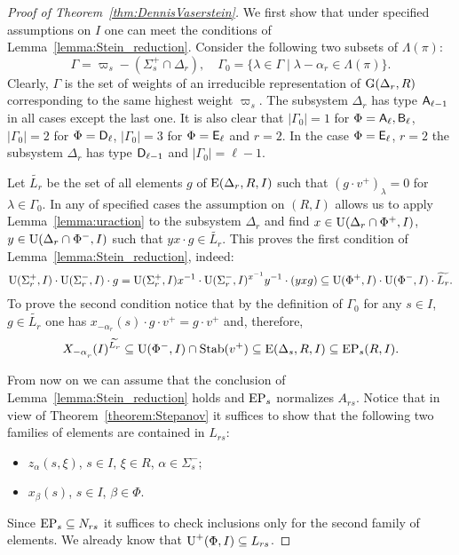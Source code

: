 \begin{proof}[Proof of Theorem~\ref{thm:DennisVaserstein}]
We first show that under specified assumptions on $I$ one can meet the conditions of Lemma~\ref{lemma:Stein_reduction}.
Consider the following two subsets of $\Lambda(\pi)$:
$$\Gamma = \varpi_s- (\Sigma_s^+\cap \Delta_r),\quad \Gamma_0 = \{\lambda \in \Gamma \mid \lambda - \alpha_r \in \Lambda(\pi) \}.$$
Clearly, $\Gamma$ is the set of weights of an irreducible representation of $\operatorname{G}(\Delta_r, R)$ corresponding to the same highest weight $\varpi_s$.
The subsystem $\Delta_r$ has type $\mathsf{A}_{\ell-1}$ in all cases except the last one.
It is also clear that $|\Gamma_0|=1$ for $\Phi=\mathsf{A}_\ell, \mathsf{B}_\ell$, $|\Gamma_0|=2$ for $\Phi=\mathsf{D}_\ell$, $|\Gamma_0|=3$ for $\Phi=\mathsf{E}_\ell$ and $r=2$.
In the case $\Phi=\mathsf{E}_\ell$, $r=2$ the subsystem $\Delta_r$ has type $\mathsf{D}_{\ell-1}$ and $|\Gamma_0|=\ell-1$.

Let $\widetilde{L_r}$ be the set of all elements $g$ of $\operatorname{E}(\Delta_r,R, I)$ such that $(g \cdot v^+)_\lambda = 0$ for $\lambda\in\Gamma_0$.
In any of specified cases the assumption on $(R, I)$ allows us to apply Lemma~\ref{lemma:uraction} to the subsystem $\Delta_r$ and find
$x\in\operatorname{U}(\Delta_r\cap\Phi^+, I)$, $y\in \operatorname{U}(\Delta_r\cap\Phi^-, I)$ such that $yx\cdot g \in \widetilde{L_r}$.
This proves the first condition of Lemma~\ref{lemma:Stein_reduction}, indeed:
$$ \operatorname{U}(\Sigma^+_r, I)\cdot \operatorname{U}(\Sigma^-_r, I) \cdot g = \operatorname{U}(\Sigma^+_r, I) x^{-1} \cdot \operatorname{U}(\Sigma^-_r, I)^{x^{-1}} y^{-1} \cdot (yxg) \subseteq \operatorname{U}(\Phi^+, I)\cdot \operatorname{U}(\Phi^-, I) \cdot \widetilde{L_r}.$$
To prove the second condition notice that by the definition of $\Gamma_0$ for any $s\in I$, $ g\in\widetilde{L_r}$ one has $x_{-\alpha_r}(s) \cdot g \cdot v^+ = g \cdot v^+$ and, therefore,
$$X_{-\alpha\ssub{r}}(I)^{\widetilde{L_r}} \subseteq \U(\Phi^-, I) \cap \Stab(v^+) \subseteq \E(\Delta_s, R, I) \subseteq \EP_s(R, I).$$

From now on we can assume that the conclusion of Lemma~\ref{lemma:Stein_reduction} holds and $\operatorname{EP}_s$ normalizes $A_{rs}$.
Notice that in view of Theorem~\ref{theorem:Stepanov} it suffices to show that the following two families of elements are contained in $L_{rs}$:
\begin{itemize} \item $z_{\alpha}(s, \xi)$, $s\in I$, $\xi \in R$, $\alpha\in\Sigma^-_s$;
\item $x_{\beta}(s)$, $s \in I$, $\beta \in \Phi$. \end{itemize}
Since $\operatorname{EP}_s \subseteq N_{rs}$ it suffices to check inclusions only for the second family of elements.
We already know that $\operatorname{U}^+(\Phi, I) \subseteq L_{rs}$.


\end{proof}
